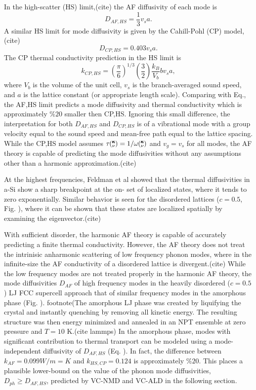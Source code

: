 \documentclass[aps,prb,twocolumn,superscriptaddress,amsmath,amssymb,floatfix]{revtex4}
\newcommand{\kv}{\mspace{-4.0mu}\left(\mspace{-8.0mu}
\begin{smallmatrix}&\pmb{\kappa} \\&\nu\end{smallmatrix}
\mspace{-3.0mu}\right)}
\begin{document}
In the high-scatter (HS) limit,(cite) the AF diffusivity of each mode is
\begin{equation}\label{EQ:M:k_HS}
D_{AF,HS} = \frac{1}{3} v_s a.
\end{equation}
A similar HS limit for mode diffusivity 
is given by the Cahill-Pohl (CP) model,(cite)  
\begin{equation}\label{EQ:M:k_HS}
D_{CP,HS} = 0.403 v_s a.
\end{equation}
The CP thermal conductivity prediction in the HS limit is
\begin{equation}\label{EQ:M:k_HS}
k_{CP,HS} = (\frac{\pi}{6})^{1/3} (\frac{3}{2}) \frac{k_{B}}{V_b}b v_s a,
\end{equation}
where $V_b$ is the volume of the unit cell, $v_s$ is the 
branch-averaged sound speed, and $a$ is the lattice constant 
(or appropriate length scale).\cite{cahill_lattice_1988} 
Comparing with Eq., the AF,HS limit predicts a mode diffusivity and 
thermal conductivity which is approximately $\%20$ smaller then 
CP,HS.\cite{cahill_lattice_1988} 
Ignoring this small difference, 
the interpretation for both $D_{AF,HS}$ and $D_{CP,HS}$ is of a vibrational 
mode with a group velocity equal to the sound speed 
and mean-free path equal to the 
lattice spacing. 
While the CP,HS model assumes $\tau\kv = 1/\omega\kv$ 
and $v_g = v_s$ for all modes, the AF theory is capable 
of predicting the mode diffusivities without 
any assumptions other than a harmonic approximation.(cite)

At the highest frequencies, Feldman et al showed that the thermal 
diffusivities in a-Si show a sharp breakpoint at the on-
set of localized states, where it tends to zero exponentially. 
Similar behavior is seen for the disordered lattices 
($c=0.5$, Fig. ), where it can be shown that these states are 
localized spatially by examining the eigenvector.(cite) 


With sufficient disorder, the 
harmonic AF theory is capable of accurately predicting a finite 
thermal conductivity.
\cite{feldman_thermal_1993,shenogin_predicting_2009} 
However, the AF theory does not 
treat the intrinisic anharmonic scattering of low frequency 
phonon modes, where in the infinite-size   
the AF conductivity of a disordered lattice is divergent.(cite)   
While the low frequency modes are not treated properly in the harmonic 
AF theory, the mode diffusivities 
$D_{AF}$ of high frequency modes in the heavily disordered ($c=0.5$) LJ 
FCC supercell approach that of similar frequency modes in the 
amorphous phase 
(Fig. ).
footnote(The amorphous LJ phase was created by liquifying the crystal 
and instantly quenching by removing all kinetic energy.  The resulting 
structure was then energy minimized and annealed in an NPT ensemble at 
zero pressure and $T=10$ K.(cite lammps)
In the amorphous phase, modes with significant 
contribution to thermal transport can be modeled using a mode-independent 
diffusivity of $D_{AF,HS}$ (Eq. ). In fact, the difference between  
$k_{AF} = 0.099 W/m=K$ and $k_{HS,CP} = 0.124$ is approximately 
$\%20$. 
This places a plausible lower-bound on the value of the phonon mode 
diffusivities, $D_{ph} \ge D_{AF,HS}$, predicted by VC-NMD and VC-ALD in 
the following section.
\end{document}
